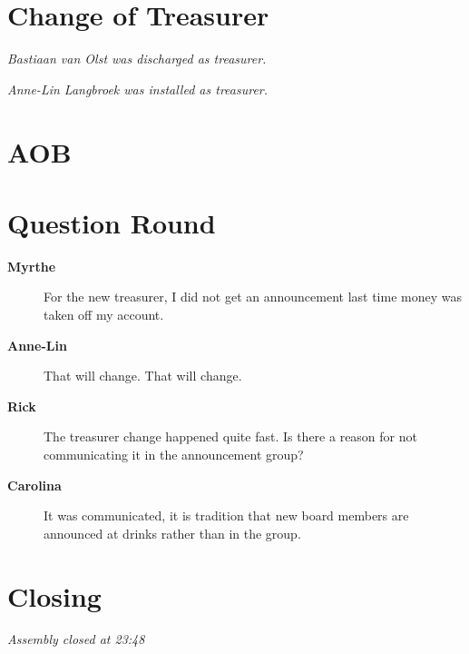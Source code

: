 \documentclass[12pt, a4paper]{article}
\newcommand{\speak}[2]{\begin{description}\item[\textbf{#1}]#2\end{description}}
\begin{document}

\section{Change of Treasurer}

\textit{Bastiaan van Olst was discharged as treasurer.}

\textit{Anne-Lin Langbroek was installed as treasurer.}



\section{AOB}

\section{Question Round}

\speak{Myrthe}{For the new treasurer, I did not get an announcement last time money was taken off my account.}

\speak{Anne-Lin}{That will change. That will change.}

\speak{Rick}{The treasurer change happened quite fast. Is there a reason for not communicating it in the announcement group?}

\speak{Carolina}{It was communicated, it is tradition that new board members are announced at drinks rather than in the group.}

\section{Closing}

\textit{Assembly closed at 23:48}





\end{document}
